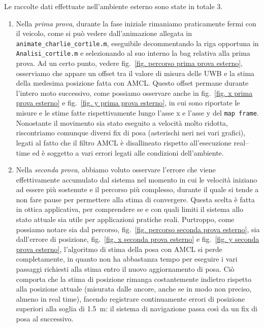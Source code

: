 \vspace{0.5cm}
Le raccolte dati effettuate nell'ambiente esterno sono state in totale 3.
\begin{enumerate}
    \item Nella \textit{prima prova}, durante la fase iniziale rimaniamo praticamente fermi con il veicolo, come si può vedere dall'animazione allegata in \verb|animate_charlie_cortile.m|, eseguibile decommentando la riga opportuna in \verb|Analisi_cortile.m| e selezionando al suo interno la bag relativa alla prima prova. Ad un certo punto, vedere fig.~\ref{fig. percorso prima prova esterno}, osserviamo che appare un offset tra il valore di misura delle UWB e la stima della medesima posizione fatta con AMCL. Questo offset permane durante l'intero moto successivo, come possiamo osservare anche in fig.~\ref{fig. x prima prova esterno} e fig.~\ref{fig. y prima prova esterno}, in cui sono riportate le misure e le stime fatte rispettivamente lungo l'asse x e l'asse y del \verb|map frame|. Nonostante il movimento sia stato eseguito a velocità molto ridotta, riscontriamo comunque diversi fix di posa (asterischi neri nei vari grafici), legati al fatto che il filtro AMCL è disallineato rispetto all'esecuzione real--time ed è soggetto a vari errori legati alle condizioni dell'ambiente.  
    
    \item Nella \textit{seconda prova}, abbiamo voluto osservare l'errore che viene effettivamente accumulato dal sistema nel momento in cui le velocità iniziano ad essere più sostenute e il percorso più complesso, durante il quale si tende a non fare pause per permettere alla stima di convergere. Questa scelta è fatta in ottica applicativa, per comprendere se e con quali limiti il sistema allo stato attuale sia utile per applicazioni pratiche reali. Purtroppo, come possiamo notare sia dal percorso, fig.~\ref{fig. percorso seconda prova esterno}, sia dall'errore di posizione, fig.~\ref{fig. x seconda prova esterno} e fig.~\ref{fig. y seconda prova esterno}, l'algoritmo di stima della posa con AMCL si perde completamente, in quanto non ha abbastanza tempo per eseguire i vari passaggi richiesti alla stima entro il nuovo aggiornamento di posa. Ciò comporta che la stima di posizione rimanga costantemente indietro rispetto alla posizione attuale (misurata dalle ancore, anche se in modo non preciso, almeno in real time), facendo registrare continuamente errori di posizione superiori alla soglia di \SI{1.5}{\metre}: il sistema di navigazione passa così da un fix di posa al successivo.
    

\end{enumerate}
